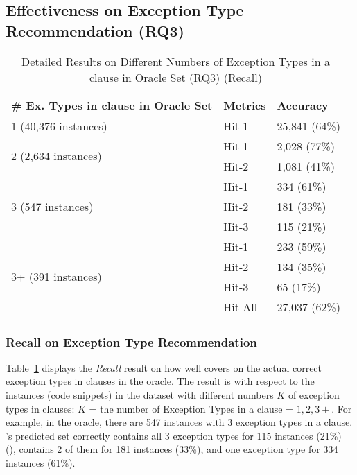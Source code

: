 \subsection{Effectiveness on Exception Type Recommendation (RQ3)}
\label{sec:rq3}

\begin{table}[t]
  \caption{Detailed Results on Different Numbers of Exception Types in a
     clause in Oracle Set (RQ3) (Recall)}
	{\small
		\begin{center}
			\renewcommand{\arraystretch}{1}
			\begin{tabular}{p{4.5cm}<{\centering}|p{1cm}<{\centering}|p{1.5cm}<{\centering}}
				\hline
				\# Ex. Types in \code{catch} clause in Oracle Set & Metrics &  Accuracy\\
				\hline
				\multirow{1}{*}{1 (40,376 instances)}   & Hit-1  & 25,841 (64\%) \\
				\hline
				\multirow{2}{*}{2 (2,634 instances)}  & Hit-1   & 2,028 (77\%) \\
				& Hit-2         &  1,081 (41\%) \\
				\hline
				\multirow{3}{*}{3 (547 instances)}  & Hit-1    & 334 (61\%) \\
				& Hit-2     & 181 (33\%)\\
				& Hit-3     & 115 (21\%) \\
				\hline
				\multirow{4}{*}{3+ (391 instances)}  & Hit-1   & 233 (59\%) \\
				& Hit-2     & 134 (35\%) \\
				& Hit-3     & 65 (17\%)\\
                                \hline
                                & Hit-All & 27,037 (62\%)\\
				\hline
			\end{tabular}		
			\label{tab:recall-3}
		\end{center}
	}
\end{table}

\subsubsection{{\bf Recall on Exception Type Recommendation}}
\label{sec:req3-recall}

Table~\ref{tab:recall-3} displays the {\em Recall} result on how well
{\tool} covers on the actual correct exception types in 
clauses in the oracle. The result is with respect to the instances
(code snippets) in the dataset with different numbers $K$ of exception
types in  clauses: $K$ = the number of Exception Types in
a  clause = $1,2,3+$. For example, in the oracle, there
are 547 instances with 3 exception types in a 
clause. {\tool}'s predicted set correctly contains all 3 exception
types for 115 instances (21\%) (), contains 2 of them
for 181 instances (33\%), and one exception type for 334 instances
(61\%).

